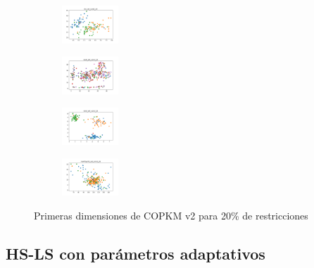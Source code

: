\begin{figure}[H]
\begin{subfigure}
    \end{subfigure}
    \hfill
    \begin{subfigure}
        \centering
        \includegraphics[width=0.234\textwidth]{img/hs-ls/iris_set_const_20_3773969821_clust.png}
    \end{subfigure}
    \hfill
    \begin{subfigure}
        \centering
        \includegraphics[width=0.234\textwidth]{img/hs-ls/ecoli_set_const_20_3773969821_clust.png}
    \end{subfigure}
    \hfill
    \begin{subfigure}
        \centering
        \includegraphics[width=0.234\textwidth]{img/hs-ls/rand_set_const_20_3773969821_clust.png}
    \end{subfigure}
    \hfill
    \begin{subfigure}
        \centering
        \includegraphics[width=0.234\textwidth]{img/hs-ls/newthyroid_set_const_20_3773969821_clust.png}
    \end{subfigure}
    \caption{Primeras dimensiones de COPKM v2 para 20\% de restricciones}
\end{figure}

\vspace*{\fill}
\newpage




\subsection{HS-LS con parámetros adaptativos}

